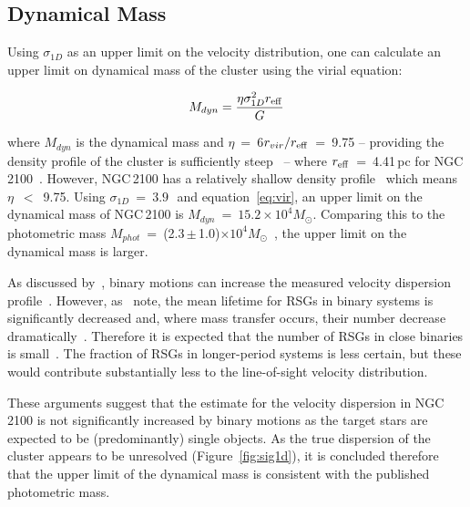
\subsection{Dynamical Mass} %
\label{sub:dynamical_mass}
Using $\sigma_{1D}$ as an upper limit on the velocity distribution, one can calculate an upper limit on dynamical mass of the cluster using the virial equation:

\begin{equation}
  M_{dyn} = \frac{\eta\sigma_{1D}^{2}r_{\rm eff}}{G}
  \label{eq:vir}
\end{equation}

\noindent where $M_{dyn}$ is the dynamical mass and $\eta$~=~6$r_{vir}/r_{\rm eff}$~=~9.75 -- providing the density profile of the cluster is sufficiently steep~\citep{2010ARA&A..48..431P} --
where $r_{\rm eff}$~=~4.41\,pc for NGC\,2100~\citep{2005ApJS..161..304M}.
However, NGC\,2100 has a relatively shallow density profile~\citep[$\gamma$~=~2.44\,$\pm$\,0.14;][]{2003MNRAS.338...85M}
which means $\eta$~$<$~9.75.
Using $\sigma_{1D}$~=~$3.9$\,\kms~and equation~\ref{eq:vir}, an upper limit on the dynamical mass of NGC\,2100 is $M_{dyn}$~=~$15.2\times 10^{4}M_{\odot}$.
Comparing this to the photometric mass $M_{phot}$~=~(2.3\,$\pm$\,1.0)$\times 10^{4}M_{\odot}$~\citep{2005ApJS..161..304M},
the upper limit on the dynamical mass is larger.

As discussed by~\citet{2010MNRAS.402.1750G}, binary motions can increase the measured velocity dispersion profile~\citep[e.g. see][]{2012A&A...546A..73H}.
However, as~\citet{2010MNRAS.402.1750G} note, the mean lifetime for RSGs in binary systems is significantly decreased and, where mass transfer occurs, their number decrease dramatically~\citep{2008MNRAS.384.1109E}.
Therefore it is expected that the number of RSGs in close binaries is small~\citep{1979MNRAS.186..831F,2009ApJ...696.2014D}.
The fraction of RSGs in longer-period systems is less certain, but these would contribute substantially less to the line-of-sight velocity distribution.

These arguments suggest that the estimate for the velocity dispersion in NGC\,2100 is not significantly increased by binary motions as the target stars are expected to be (predominantly) single objects. As the true dispersion of the cluster appears to be unresolved (Figure~\ref{fig:sig1d}), it is concluded therefore that the upper limit of the dynamical mass is consistent with the published photometric mass.

